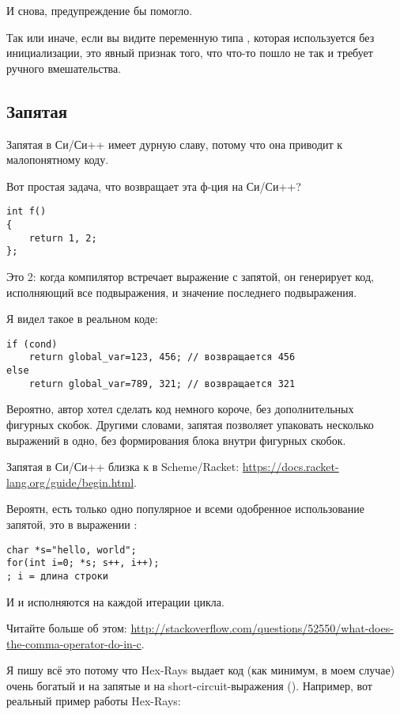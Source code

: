 И снова, предупреждение бы помогло.

Так или иначе, если вы видите переменную типа , которая используется без инициализации, это явный признак того,
что что-то пошло не так и требует ручного вмешательства.

\subsection{Запятая}

Запятая в Си/Си++ имеет дурную славу, потому что она приводит к малопонятному коду.

Вот простая задача, что возвращает эта ф-ция на Си/Си++?

\begin{lstlisting}
int f()
{
	return 1, 2;
};
\end{lstlisting}

Это 2: когда компилятор встречает выражение с запятой, он генерирует код, исполняющий все подвыражения, и 
значение последнего подвыражения.

Я видел такое в реальном коде:

\begin{lstlisting}
if (cond)
	return global_var=123, 456; // возвращается 456
else
	return global_var=789, 321; // возвращается 321
\end{lstlisting}

Вероятно, автор хотел сделать код немного короче, без дополнительных фигурных скобок.
Другими словами, запятая позволяет упаковать несколько выражений в одно, без формирования
блока внутри фигурных скобок.

Запятая в Си/Си++ близка к  в Scheme/Racket: \url{https://docs.racket-lang.org/guide/begin.html}.

Вероятн, есть только одно популярное и всеми одобренное использование запятой, это в выражении :

\begin{lstlisting}
char *s="hello, world";
for(int i=0; *s; s++, i++);
; i = длина строки
\end{lstlisting}

И  и  исполняются на каждой итерации цикла.

Читайте больше об этом: \url{http://stackoverflow.com/questions/52550/what-does-the-comma-operator-do-in-c}.

Я пишу всё это потому что Hex-Rays выдает код (как минимум, в моем случае) очень богатый и на запятые и на
short-circuit-выражения ().
Например, вот реальный пример работы Hex-Rays:

